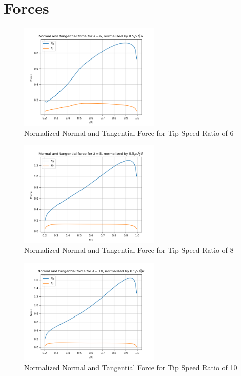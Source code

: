 \section{Forces}
\begin{figure}[H]
    \centering
    \includegraphics[width=0.6\textwidth]{Figures/F_t_F_n_6.png}
    \caption{Normalized Normal and Tangential Force for Tip Speed Ratio of 6}
    \label{fig:normalized normal and tangential force - lambda 6}
\end{figure}\begin{figure}[H]
    \centering
    \includegraphics[width=0.6\textwidth]{Figures/Ft_Fn_8.png}
    \caption{Normalized Normal and Tangential Force for Tip Speed Ratio of 8}
    \label{fig:normalized normal and tangential force - lambda 8}
\end{figure}\begin{figure}[H]
    \centering
    \includegraphics[width=0.6\textwidth]{Figures/Ft_Fn_10.png}
    \caption{Normalized Normal and Tangential Force for Tip Speed Ratio of 10}
    \label{fig:normalized normal and tangential force - lambda 10}
\end{figure}


